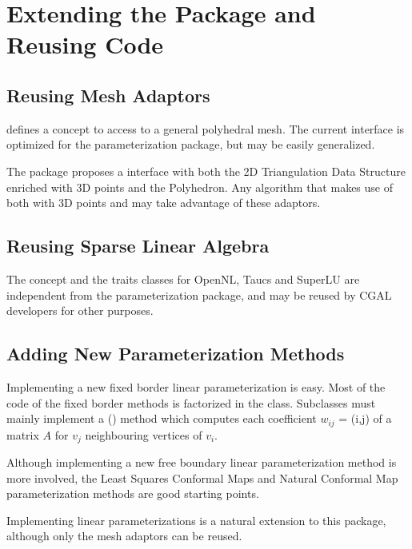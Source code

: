 \section{Extending the Package and Reusing Code}

\subsection{Reusing Mesh Adaptors}

 defines a concept to access to a
general polyhedral mesh.  The current interface is optimized for the
parameterization package, but may be easily generalized.

The package proposes a  interface with
both the 2D Triangulation Data Structure enriched with 3D points and
the Polyhedron. Any algorithm that makes use of both
 with 3D points and
 may take advantage of these adaptors.


\subsection{Reusing Sparse Linear Algebra}

The  concept and the traits classes
for OpenNL, {\sc Taucs} and SuperLU are independent from the
parameterization package, and may be reused by CGAL developers for
other purposes.


\subsection{Adding New Parameterization Methods}

Implementing a new fixed border linear parameterization is easy.  Most
of the code of the fixed border methods is factorized in the
 class.  Subclasses must mainly
implement a () method which computes each
coefficient $w_{ij}$ = (i,j) of a matrix $A$ for $v_j$ neighbouring
vertices of $v_i$.

Although implementing a new free boundary linear parameterization
method is more involved, the Least Squares Conformal Maps and Natural
Conformal Map parameterization methods are good starting points.

Implementing  linear parameterizations is a natural extension
to this package, although only the mesh adaptors can be reused.


